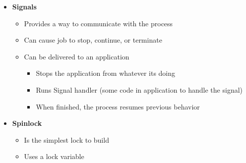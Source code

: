 \documentclass[12pt]{article}
\begin{document}
\begin{enumerate}[1.]
\begin{itemize}
\begin{itemize}
            (wait. this is PCB)

            \item Exists in one of many different \textbf{process states}, including

            \begin{enumerate}[1.]
                \item Running
                \item Ready to Run
                \item Blocked
            \end{enumerate}

            \bigskip

            \begin{itemize}
                \item Different events (Getting Scheduled, descheduled, or waiting for I/O)
                transitions one of these states to the other
            \end{itemize}

        \end{itemize}

        \item \textbf{Signals}

        \begin{itemize}
            \item Provides a way to communicate with the process
            \item Can cause job to stop, continue, or terminate
            \item Can be delivered to an application

            \begin{itemize}
                \item Stops the application from whatever its doing
                \item Runs Signal handler (some code in application to handle the signal)
                \item When finished, the process resumes previous behavior
            \end{itemize}
        \end{itemize}

        \item \textbf{Spinlock}
        \begin{itemize}
            \item Is the simplest lock to build
            \item Uses a lock variable


\end{itemize}
\end{itemize}
\end{enumerate}
\end{document}
